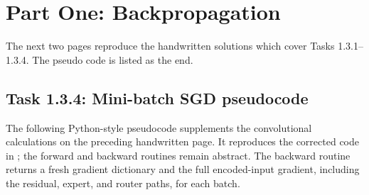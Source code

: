 \section{Part One: Backpropagation}
\label{sec:part1}
The next two pages reproduce the handwritten solutions which cover Tasks 1.3.1--1.3.4. 
The pseudo code is listed as the end.



\subsection*{Task 1.3.4: Mini-batch SGD pseudocode}
The following Python-style pseudocode supplements the convolutional calculations
on the preceding handwritten page. It reproduces the corrected code in
; the forward and backward routines remain abstract.
The backward routine returns a fresh gradient dictionary and the full encoded-input
gradient, including the residual, expert, and router paths, for each batch.



\clearpage

